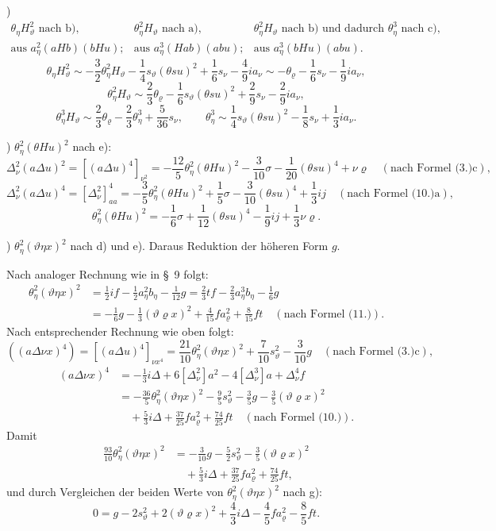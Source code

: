 \documentclass[11pt]{article}
\newcommand{\A}{\Delta}
\newcommand{\R}{\varrho}
\begin{document}
)
\[
\begin{array}{ccc}
\theta_\eta H_\vartheta^2\text{ nach b)},&
\theta_\eta^2H_\vartheta\text{ nach a)},&
\theta_\eta^2H_\vartheta\text{ nach b) und dadurch }\theta_\eta^3\text{ nach c)},\\
\text{aus }a_\eta^2(aHb)(bHu);&
\text{aus }a_\eta^3(Hab)(abu);&
\text{aus }a_\eta^3(bHu)(abu).
\end{array}
\]
\[
\theta_\eta H_\vartheta^2\sim-\frac32\theta_\eta^2H_\vartheta-\frac14s_\vartheta(\theta su)^2+\frac16s_\nu-\frac49ia_\nu
\sim-\theta_\R-\frac16s_\nu-\frac19ia_\nu,
\]
\[
\theta_\eta^2H_\vartheta\sim\frac23\theta_\R-\frac16s_\vartheta(\theta su)^2+\frac29s_\nu-\frac29ia_\nu,
\]
\[
\theta_\eta^3H_\vartheta\sim\frac23\theta_\R-\frac23\theta_\eta^3+\frac5{36}s_\nu,
\qquad
\theta_\eta^3\sim\frac14s_\vartheta(\theta su)^2-\frac18s_\nu+\frac13ia_\nu.
\]

) $\theta_\eta^2(\theta Hu)^2$ nach e):
\[
\A_\nu^2(a\A u)^2=[(a\A u)^4]_{\nu^2}
=-\frac{12}{5}\theta_\eta^2(\theta Hu)^2-\frac3{10}\sigma-\frac1{20}(\theta su)^4+\nu\R
\quad(\text{nach Formel (3.)c}),
\]
\[
\A_\nu^2(a\A u)^4=[\A_\nu^2]_{aa}^4=-\frac35\theta_\eta^2(\theta Hu)^2+\frac15\sigma-\frac3{10}(\theta su)^4+\frac13ij
\quad(\text{nach Formel (10.)a}),
\]
\[
\theta_\eta^2(\theta Hu)^2=-\frac16\sigma+\frac1{12}(\theta su)^4-\frac19ij+\frac13\nu\R.
\]

) $\theta_\eta^2(\vartheta\eta x)^2$ nach d) und e). Daraus Reduktion der höheren Form $g$.

Nach analoger Rechnung wie in \S\ 9 folgt:
\[
\begin{aligned}
\theta_\eta^2(\vartheta\eta x)^2
&=\frac12 i f-\frac12a_\eta^2b_\eta-\frac1{12}g
=\frac23tf-\frac23a_\eta^3b_\eta-\frac16g\\
&=-\frac16g-\frac13(\vartheta\R x)^2+\frac4{15}fa_\R^2+\frac8{15}ft
\quad(\text{nach Formel (11.)}).
\end{aligned}
\]
Nach entsprechender Rechnung wie oben folgt:
\[
((a\A\nu x)^4)=[(a\A u)^4]_{\nu x^4}
=\frac{21}{10}\theta_\eta^2(\vartheta\eta x)^2+\frac7{10}s_\vartheta^2-\frac3{10}g
\quad(\text{nach Formel (3.)c}),
\]
\[
\begin{aligned}
(a\A\nu x)^4&=-\frac13i\A+6[\A_\nu^2]a^2-4[\A_\nu^3]a+\A_\nu^4f\\
&= -\frac{36}{5}\theta_\eta^2(\vartheta\eta x)^2-\frac95s_\vartheta^2-\frac35g-\frac35(\vartheta\R x)^2\\
&\quad+\frac53i\A+\frac{37}{25}fa_\R^2+\frac{74}{25}ft\quad(\text{nach Formel (10.)}).
\end{aligned}
\]
Damit
\[
\begin{aligned}
\frac{93}{10}\theta_\eta^2(\vartheta\eta x)^2
&=-\frac3{10}g-\frac52s_\vartheta^2-\frac35(\vartheta\R x)^2\\
&\quad+\frac53i\A+\frac{37}{25}fa_\R^2+\frac{74}{25}ft,
\end{aligned}
\]
und durch Vergleichen der beiden Werte von $\theta_\eta^2(\vartheta\eta x)^2$ nach g):
\[
\tag{13}
0=g-2s_\vartheta^2+2(\vartheta\R x)^2+\frac43i\A-\frac45fa_\R^2-\frac85ft.
\]
\end{document}
